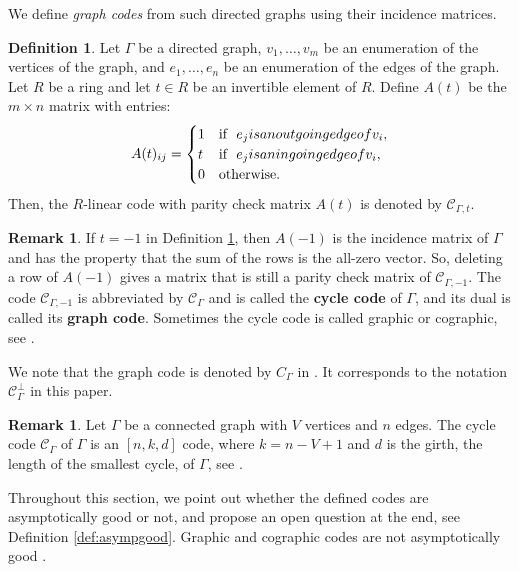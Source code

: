 \documentclass[11pt,a4paper]{article}
\theoremstyle{definition}
\newtheorem{definition}[theorem]{Definition}
\newtheorem{remark}[theorem]{Remark}
\newcommand{\mC}{\mathcal{C}}
\begin{document}
We define \textit{graph codes} from such directed graphs using their incidence matrices.

\begin{definition}
\label{def:graphcode}
Let $\Gamma$ be a directed graph, $v_1,\ldots,v_m$ be an enumeration of the vertices of the graph, and $e_1,\ldots ,e_n$ be an enumeration of the edges of the graph. Let $R$ be a ring and let $t\in R$ be an invertible element of $R$. Define $A(t)$ be the $m \times n$ matrix with entries:
$$
A(t)_{ij} = 
\begin{cases}
1 & \text{if} \ \ e_j \textnormal{ is an outgoing edge of } v_i,\\
t & \text{if} \ \ e_j \textnormal{ is an ingoing edge of } v_i,\\
0 & \text{otherwise}.
\end{cases}
$$
Then, the $R$-linear code with parity check matrix $A(t)$ is denoted by $\mC_{\Gamma,t}$.
\end{definition}

\begin{remark}\label{r-A(t)}
If $t=-1$ in Definition \ref{def:graphcode}, then $A(-1)$ is the incidence matrix of $\Gamma$ and has the property that the sum of the rows is the all-zero vector.
So, deleting a row of $A(-1)$ gives a matrix that is still a parity check matrix of $\mC_{\Gamma,-1}$.
The code $\mC_{\Gamma,-1}$ is abbreviated by $\mC_{\Gamma}$ and is called the \textbf{cycle code} of $\Gamma $,
and its dual is called its \textbf{graph code}.
Sometimes the cycle code is called graphic or cographic, see \cite[\S 8.1.2]{pellikaan2018}. 
\end{remark}

We note that the graph code is denoted by $C_{\Gamma}$ in \cite[\S 8.1.2]{pellikaan2018}. It corresponds to the notation $\mC_{\Gamma}^\perp $ in this paper.


\begin{remark}\label{r-param-cyclecode}
Let $\Gamma$ be a connected graph with $V$ vertices and $n$ edges.
The cycle code $\mC_{\Gamma}$ of $\Gamma $ is an $[n,k,d]$ code,
where $k=n-V+1$ and $d$ is the girth, the length of the smallest cycle, of $\Gamma$, see \cite[Proposition 8.1.22]{pellikaan2018}. 
\end{remark}

Throughout this section, we point out whether the defined codes are asymptotically good or not, and propose an open question at the end, see Definition \ref{def:asympgood}. Graphic and cographic codes are not asymptotically good \cite{kashyap2008}.
\end{document}
